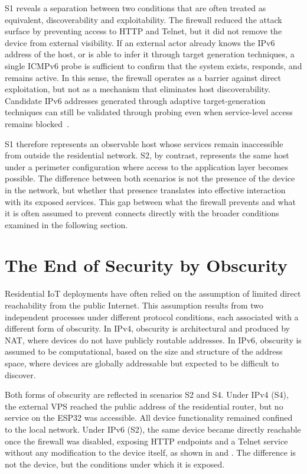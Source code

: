 S1 reveals a separation between two conditions that are often treated as equivalent, discoverability and exploitability. The firewall reduced the attack surface by preventing access to HTTP and Telnet, but it did not remove the device from external visibility. If an external actor already knows the IPv6 address of the host, or is able to infer it through target generation techniques, a single ICMPv6 probe is sufficient to confirm that the system exists, responds, and remains active. In this sense, the firewall operates as a barrier against direct exploitation, but not as a mechanism that eliminates host discoverability. Candidate IPv6 addresses generated through adaptive target-generation techniques can still be validated through probing even when service-level access remains blocked~\cite{williams20246sense}.

S1 therefore represents an observable host whose services remain inaccessible from outside the residential network. S2, by contrast, represents the same host under a perimeter configuration where access to the application layer becomes possible. The difference between both scenarios is not the presence of the device in the network, but whether that presence translates into effective interaction with its exposed services. This gap between what the firewall prevents and what it is often assumed to prevent connects directly with the broader conditions examined in the following section.

\section{The End of Security by Obscurity}

Residential IoT deployments have often relied on the assumption of limited direct reachability from the public Internet. This assumption results from two independent processes under different protocol conditions, each associated with a different form of obscurity. In IPv4, obscurity is architectural and produced by NAT, where devices do not have publicly routable addresses. In IPv6, obscurity is assumed to be computational, based on the size and structure of the address space, where devices are globally addressable but expected to be difficult to discover.

Both forms of obscurity are reflected in scenarios S2 and S4. Under IPv4 (S4), the external VPS reached the public address of the residential router, but no service on the ESP32 was accessible. All device functionality remained confined to the local network. Under IPv6 (S2), the same device became directly reachable once the firewall was disabled, exposing HTTP endpoints and a Telnet service without any modification to the device itself, as shown in  and . The difference is not the device, but the conditions under which it is exposed.


